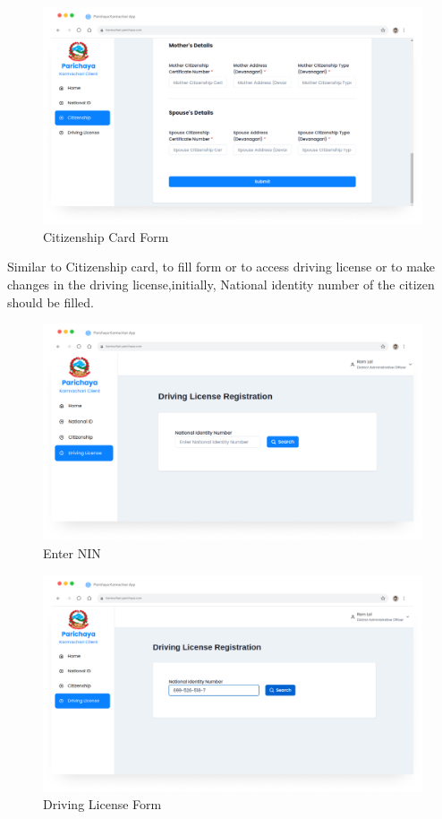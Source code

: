          \begin{figure}[H]
        \centering
        \includegraphics[width=0.8\linewidth]{images/results/web/WebCitizenshipRegistration3.png}
        \caption[Citizenship Card Form]{Citizenship Card Form}
        \label{fig:WebCitizenshipRegistration3.png}
        \end{figure}
    Similar to Citizenship card, to fill form or to access driving license or to make changes in the driving license,initially, National identity number of the citizen should be filled. 

        \begin{figure}[H]
        \centering
        \includegraphics[width=0.8\linewidth]{images/results/web/WebDrivingLiceseRegistration1.png}
        \caption[Enter NIN]{Enter NIN}
        \label{fig:WebDrivingLiceseRegistration1.png}
        \end{figure}
           \begin{figure}[H]
        \centering
        \includegraphics[width=0.8\linewidth]{images/results/web/WebDrivingLicenseRegistration2.png}
        \caption[Driving License Form]{Driving License Form}
        \label{fig:WebDrivingLicenseRegistration2.png}
        \end{figure}


